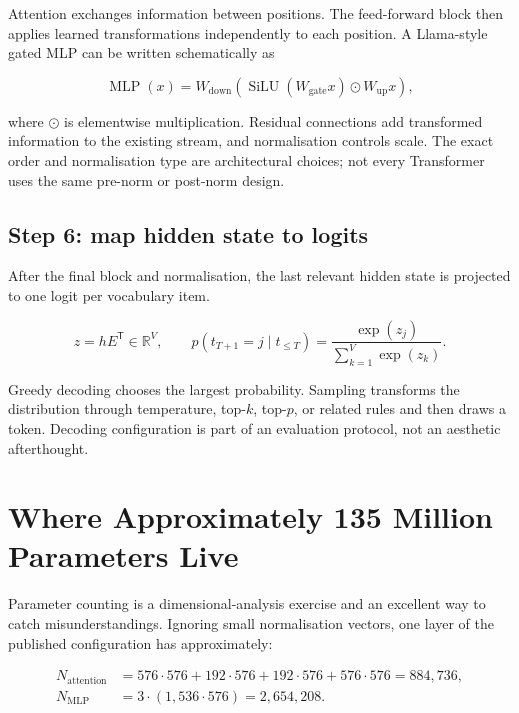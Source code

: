 Attention exchanges information between positions.
The feed-forward block then applies learned transformations independently to
each position.
A Llama-style gated MLP can be written schematically as

\begin{equation}
    \operatorname{MLP}(x) =
    W_{\mathrm{down}}
    \left(\operatorname{SiLU}(W_{\mathrm{gate}}x)
    \odot W_{\mathrm{up}}x\right),
    \label{eq:gated-mlp}
\end{equation}

where $\odot$ is elementwise multiplication.
Residual connections add transformed information to the existing stream, and
normalisation controls scale.
The exact order and normalisation type are architectural choices; not every
Transformer uses the same pre-norm or post-norm design.

\subsection{Step 6: map hidden state to logits}

After the final block and normalisation, the last relevant hidden state is
projected to one logit per vocabulary item.

\begin{equation}
    z = hE^{\mathsf T}\in\mathbb{R}^{V},
    \qquad
    p(t_{T+1}=j\mid t_{\leq T})=
    \frac{\exp(z_j)}{\sum_{k=1}^{V}\exp(z_k)}.
    \label{eq:next-token-softmax}
\end{equation}

Greedy decoding chooses the largest probability.
Sampling transforms the distribution through temperature, top-$k$, top-$p$,
or related rules and then draws a token.
Decoding configuration is part of an evaluation protocol, not an aesthetic
afterthought.

\section{Where Approximately 135 Million Parameters Live}

Parameter counting is a dimensional-analysis exercise and an excellent way to
catch misunderstandings.
Ignoring small normalisation vectors, one layer of the published configuration
has approximately:

\begin{align}
    N_{\mathrm{attention}}
    &= 576\cdot576
      + 192\cdot576
      + 192\cdot576
      + 576\cdot576
      = 884{,}736,
      \label{eq:smollm-attention-parameters}\\
    N_{\mathrm{MLP}}
    &= 3\cdot(1{,}536\cdot576)
      = 2{,}654{,}208.
      \label{eq:smollm-mlp-parameters}
\end{align}

